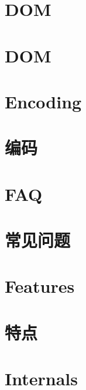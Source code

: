 \documentclass[twoside]{book}
\newcommand{\+}{\discretionary{\mbox{\scriptsize$\hookleftarrow$}}{}{}}
\begin{document}
\chapter{DOM}
\label{md_src_rapidjson_doc_dom}

\chapter{DOM}
\label{md_src_rapidjson_doc_dom_zh_cn}

\chapter{Encoding}
\label{md_src_rapidjson_doc_encoding}

\chapter{编码}
\label{md_src_rapidjson_doc_encoding_zh_cn}

\chapter{FAQ}
\label{md_src_rapidjson_doc_faq}

\chapter{常见问题}
\label{md_src_rapidjson_doc_faq_zh_cn}

\chapter{Features}
\label{md_src_rapidjson_doc_features}

\chapter{特点}
\label{md_src_rapidjson_doc_features_zh_cn}

\chapter{Internals}
\label{md_src_rapidjson_doc_internals}

\end{document}
